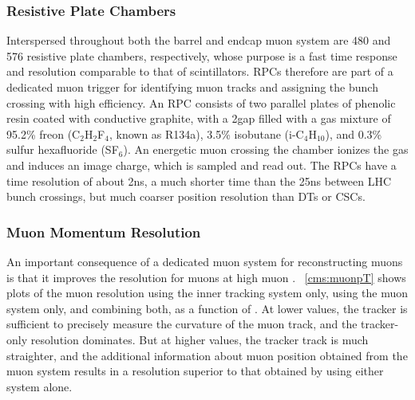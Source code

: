 \subsubsection{Resistive Plate Chambers}
Interspersed throughout both the barrel and endcap muon system are 480 and 576 resistive plate chambers, respectively, whose purpose is a fast time response and resolution comparable to that of scintillators.
RPCs therefore are part of a dedicated muon trigger for identifying muon tracks and assigning the bunch crossing with high efficiency.
An RPC consists of two parallel plates of phenolic resin coated with conductive graphite, with a 2\mm gap filled with a gas mixture of 95.2\% freon (C$_2$H$_2$F$_4$, known as R134a), 3.5\% isobutane (i-C$_4$H$_{10}$), and 0.3\% sulfur hexafluoride (SF$_6$).
An energetic muon crossing the chamber ionizes the gas and induces an image charge, which is sampled and read out.
The RPCs have a time resolution of about 2\unit{ns}, a much shorter time than the 25\unit{ns} between LHC bunch crossings, but much coarser position resolution than DTs or CSCs.

\subsubsection{Muon Momentum Resolution}
An important consequence of a dedicated muon system for reconstructing muons is that it improves the \pT resolution for muons at high muon \pT.
\Fig~\ref{cms:muonpT} shows plots of the muon \pT resolution using the inner tracking system only, using the muon system only, and combining both, as a function of \pT.
At lower \pT values, the tracker is sufficient to precisely measure the curvature of the muon track, and the tracker-only resolution dominates.
But at higher \pT values, the tracker track is much straighter, and the additional information about muon position obtained from the muon system results in a \pT resolution superior to that obtained by using either system alone.

